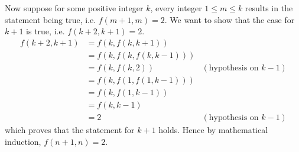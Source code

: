 \begin{questions}
\begin{partquestions}{\roman*}
        Now suppose for some positive integer $k$, every integer $1 \leq m \leq k$ results in the statement being true, i.e. $f(m+1,m) = 2$. We want to show that the case for $k+1$ is true, i.e. $f(k+2, k+1) = 2$.
        \begin{align*}
            f(k+2, k+1) &= f(k, f(k, k+1))\\
            &= f(k, f(k, f(k, k-1)))\\
            &= f(k, f(k, 2)) & (\text{hypothesis on } k-1)\\
            &= f(k, f(1, f(1, k-1)))\\
            &= f(k, f(1, k-1))\\
            &= f(k, k-1) \\
            &= 2 & (\text{hypothesis on } k-1)
        \end{align*}
        which proves that the statement for $k+1$ holds. Hence by mathematical induction, $f(n+1, n) = 2$.
        

\end{partquestions}
\end{questions}

